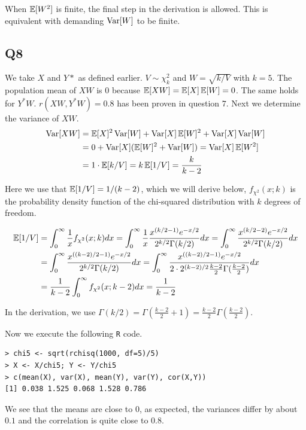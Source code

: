 When $\operatorname{\mathbb{E}}[W^2]$ is finite, the final step in the derivation is allowed. This is equivalent with demanding $\operatorname{\text{Var}}[W]$ to be finite.

\subsection*{Q8}

We take $X$ and $Y*$ as defined earlier. $V \sim \chi^2_k$ and $W = \sqrt{k/V}$ with $k=5$.  The population mean of $XW$ is $0$ because $\operatorname{\mathbb{E}}[XW] = \operatorname{\mathbb{E}}[X]\operatorname{\mathbb{E}}[W] = 0$. The same holds for $Y^{*}W$. $r(XW,Y^{*}W) = 0.8$ has been proven in question $7$.
Next we determine the variance of $XW$.
\begin{align*}
\operatorname{\text{Var}}[XW] & = \operatorname{\mathbb{E}}[X]^2 \operatorname{\text{Var}}[W] + \operatorname{\text{Var}}[X] \operatorname{\mathbb{E}}[W]^2 + \operatorname{\text{Var}}[X]\operatorname{\text{Var}}[W] \\
         & =  0 + \operatorname{\text{Var}}[X](\operatorname{\mathbb{E}}[W]^2 + \operatorname{\text{Var}}[W]) = \operatorname{\text{Var}}[X]\operatorname{\mathbb{E}}[W^2] \\
         & = 1 \cdot \operatorname{\mathbb{E}}[k/V] = k \operatorname{\mathbb{E}}[1/V] = \frac{k}{k-2}
\end{align*}

Here we use that $\operatorname{\mathbb{E}}[1/V] = 1/(k-2)$, which we will derive below,  $f_{\chi^2}(x; k)$ is the probability density function of the chi-squared distribution with $k$ degrees of freedom.

\begin{align*}
\operatorname{\mathbb{E}}[1/V] & = \int_{0}^{\infty} \frac{1}{x} f_{\chi^2}(x; k) dx = \int_{0}^{\infty} \frac{1}{x} \frac{x^{\left( k/2 - 1\right) }e^{-x/2}}{2^{k/2}\Gamma(k/2)} dx = \int_{0}^{\infty} \frac{x^{\left( k/2 - 2\right) }e^{-x/2}}{2^{k/2}\Gamma(k/2)} dx \\
        & = \int_{0}^{\infty} \frac{x^{\left(\left(k-2\right)/2 - 1\right) }e^{-x/2}}{2^{k/2}\Gamma(k/2)} dx = \int_{0}^{\infty} \frac{x^{\left(\left(k-2\right)/2 - 1\right) }e^{-x/2}}{2 \cdot 2^{\left(k-2\right)/2}\frac{k-2}{2} \Gamma(\frac{k-2}{2})} dx \\
        & = \frac{1}{k-2} \int_{0}^{\infty} f_{\chi^2}(x; k-2) dx = \frac{1}{k-2}
\end{align*}

In the derivation, we use $\Gamma(k/2) = \Gamma(\frac{k-2}{2} + 1) = \frac{k-2}{2} \Gamma(\frac{k-2}{2})$.

Now we execute the following \verb|R| code.

\begin{verbatim}
> chi5 <- sqrt(rchisq(1000, df=5)/5)
> X <- X/chi5; Y <- Y/chi5 
> c(mean(X), var(X), mean(Y), var(Y), cor(X,Y))
[1] 0.038 1.525 0.068 1.528 0.786
\end{verbatim}

We see that the means are close to $0$, as expected, the variances differ by about $0.1$ and the correlation is quite close to $0.8$.
